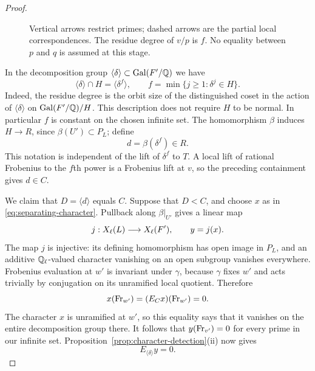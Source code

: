 \begin{proof}
\begin{figure}[htbp]
\centering
{}
\caption{Vertical arrows restrict primes; dashed arrows are the
partial local correspondences. The residue degree of $v/p$ is $f$.
No equality between $p$ and $q$ is assumed at this stage.}
\label{fig:generation-primes}
\end{figure}

In the decomposition group
$\langle\delta\rangle\subset\operatorname{Gal}(F'/\mathbb Q)$ we have
\begin{equation}\label{eq:residue-degree-intersection}
 \langle\delta\rangle\cap H=\langle\delta^f\rangle,
 \qquad
 f=\min\{j\geq1:\delta^j\in H\}.
\end{equation}
Indeed, the residue degree is the orbit size of the distinguished
coset in the action of $\langle\delta\rangle$ on
$\operatorname{Gal}(F'/\mathbb Q)/H$. This description does not require $H$ to be
normal. In particular $f$ is constant on the chosen infinite set.
The homomorphism $\beta$ induces $H\to R$, since
$\beta(U')\subset P_L$; define
\[
 d=\beta(\delta^f)\in R.
\]
This notation is independent of the lift of $\delta^f$ to $T$.
A local lift of rational Frobenius to the $f$th power is a
Frobenius lift at $v$, so the preceding containment gives $d\in C$.

We claim that $D=\langle d\rangle$ equals $C$. Suppose that $D<C$,
and choose $x$ as in \eqref{eq:separating-character}. Pullback along
$\beta|_{U'}$ gives a linear map
\[
 j:X_{\ell}(L)\longrightarrow X_{\ell}(F'),\qquad y=j(x).
\]
The map $j$ is injective: its defining homomorphism has open image
in $P_L$, and an additive $\mathbb Q_\ell$-valued character vanishing on
an open subgroup vanishes everywhere. Frobenius evaluation at $w'$
is invariant under $\gamma$, because $\gamma$ fixes $w'$ and acts
trivially by conjugation on its unramified local quotient. Therefore
\[
 x(\operatorname{Fr}_{w'})=(E_Cx)(\operatorname{Fr}_{w'})=0.
\]
The character $x$ is unramified at $w'$, so this equality says that
it vanishes on the entire decomposition group there. It follows
that $y(\operatorname{Fr}_{v'})=0$ for every prime in our infinite set.
Proposition~\ref{prop:character-detection}(ii) now gives
\begin{equation}\label{eq:source-average-zero}
 E_{\langle\delta\rangle}y=0.
\end{equation}


\end{proof}
